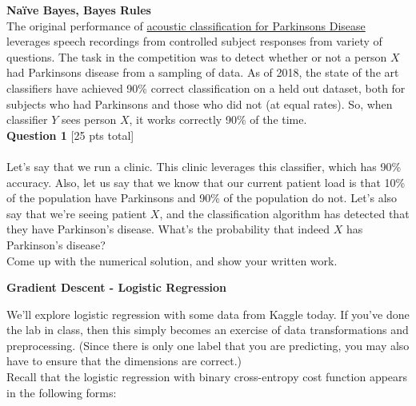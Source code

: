 \documentclass[paper=a4, fontsize=11pt]{scrartcl} %
\author{
    \textbf{YOUR NAME} \\ 
    \textbf{YOUR GIT USERNAME} \\ 
    \textbf{YOUR E-MAIL}
}%
\begin{document}
\maketitle %

{\huge \textbf{Na\"ive Bayes, Bayes Rules}} \\

The original performance of \href{https://www.ncbi.nlm.nih.gov/pmc/articles/PMC6339026/}{acoustic classification for Parkinsons Disease} leverages speech recordings from controlled subject responses from variety of questions. The task in the competition was to detect whether or not a person $X$ had Parkinsons disease from a sampling of data. As of 2018, the state of the art classifiers have achieved 90\% correct classification on a held out dataset, both for subjects who had Parkinsons and those who did not (at equal rates). So, when classifier $Y$ sees person $X$, it works correctly 90\% of the time. \\

{\Large \textbf{Question 1} [25 pts total]} \\
\\
Let's say that we run a clinic. This clinic leverages this classifier, which has 90\% accuracy. Also, let us say that we know that our current patient load is that 10\% of the population have Parkinsons and 90\% of the population do not. Let's also say that we're seeing patient $X$, and the classification algorithm has detected that they have Parkinson's disease. What's the probability that indeed $X$ has Parkinson's disease? \\

Come up with the numerical solution, and show your written work.


\vspace{1.5cm}
{\huge \textbf{Gradient Descent - Logistic Regression}}
\vspace{3mm}

We'll explore logistic regression with some data from Kaggle today. If you've done the lab in class, then this simply becomes an exercise of data transformations and preprocessing. (Since there is only one label that you are predicting, you may also have to ensure that the dimensions are correct.) \\

Recall that the logistic regression with binary cross-entropy cost function appears in the following forms: \\
\end{document}
